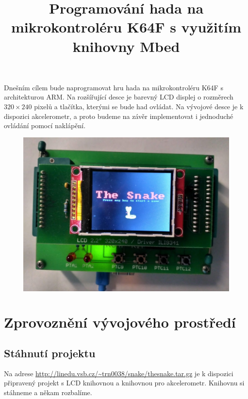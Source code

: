 \documentclass[12pt]{article}
\title{Programování hada na mikrokontroléru K64F s využitím knihovny Mbed}
\date{}
\begin{document}
\sloppy
\maketitle

Dnešním cílem bude naprogramovat hru hada na mikrokontroléru K64F s architekturou ARM.
Na rozšířující desce je barevný LCD displej o rozměrech $320 \times 240$ pixelů a tlačítka, kterými se bude had ovládat.
Na vývojové desce je k dispozici akcelerometr, a proto budeme na závěr implementovat i jednoduché ovládání pomocí naklápění.

\begin{figure}[h]
\includegraphics[width=\linewidth]{figures/snake}
\end{figure}




\section{Zprovoznění vývojového prostředí}
\subsection{Stáhnutí projektu}
Na adrese \url{http://linedu.vsb.cz/~trn0038/snake/thesnake.tar.gz} je k dispozici připravený projekt s LCD knihovnou a knihovnou pro akcelerometr.
Knihovnu si stáhneme a někam rozbalíme.
\end{document}
